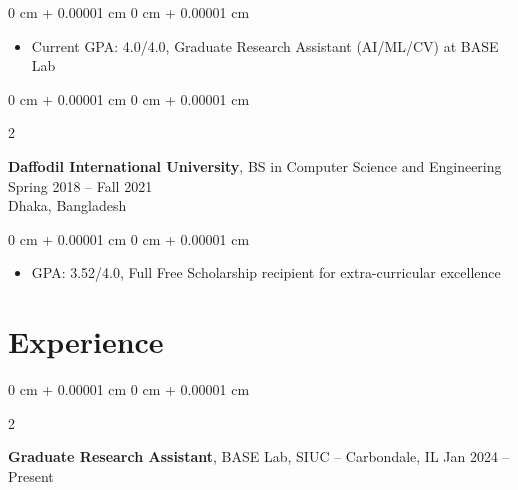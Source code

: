 \documentclass[10pt, letterpaper]{article}
\newenvironment{highlights}{
    \begin{itemize}[
        topsep=0.10 cm,
        parsep=0.10 cm,
        partopsep=0pt,
        itemsep=0pt,
        leftmargin=0 cm + 10pt
    ]
}{
    \end{itemize}
} %
\newenvironment{onecolentry}{
    \begin{adjustwidth}{
        0 cm + 0.00001 cm
    }{
        0 cm + 0.00001 cm
    }
}{
    \end{adjustwidth}
} %
\newenvironment{twocolentry}[2][]{
    \onecolentry
    \def\secondColumn{#2}
    \setcolumnwidth{\fill, 4.5 cm}
    \begin{paracol}{2}
}{
    \switchcolumn \raggedleft \secondColumn
    \end{paracol}
    \endonecolentry
} %
\begin{document}
        \vspace{-0.40 cm}
        \begin{onecolentry}
            \begin{highlights}
                \item Current GPA: 4.0/4.0, Graduate Research Assistant (AI/ML/CV) at BASE Lab 
            \end{highlights}
        \end{onecolentry}

        \vspace{0.25 cm}
        \begin{twocolentry}{
            Spring 2018 – Fall 2021
            \\Dhaka, Bangladesh
        }
            \textbf{Daffodil International University}, BS in Computer Science and Engineering\end{twocolentry}

        \vspace{-0.40 cm}
        \begin{onecolentry}
            \begin{highlights}
                \item GPA: 3.52/4.0, Full Free Scholarship recipient for extra-curricular excellence
            \end{highlights}
        \end{onecolentry}



    
    \section{Experience}


        
        \begin{twocolentry}{
            Jan 2024 – Present
        }
            \textbf{Graduate Research Assistant}, BASE Lab, SIUC -- Carbondale, IL\end{twocolentry}
\end{document}
